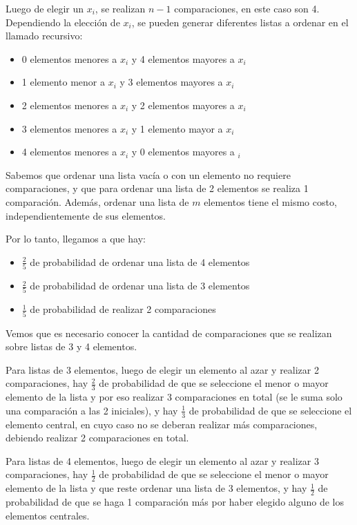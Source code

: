 \documentclass[11pt]{article}
\begin{document}
Luego de elegir un $x_i$, se realizan $n-1$ comparaciones, en este caso son 4. Dependiendo la elección de $x_i$, se pueden generar diferentes listas a ordenar en el llamado recursivo:

\begin{itemize}
    \item 0 elementos menores a $x_i$ y 4 elementos mayores a $x_i$
    \item 1 elemento menor a $x_i$ y 3 elementos mayores a $x_i$
    \item 2 elementos menores a $x_i$ y 2 elementos mayores a $x_i$
    \item 3 elementos menores a $x_i$ y 1 elemento mayor a $x_i$
    \item 4 elementos menores a $x_i$ y 0 elementos mayores a $_i$
\end{itemize}

Sabemos que ordenar una lista vacía o con un elemento no requiere comparaciones, y que para ordenar una lista de 2 elementos se realiza 1 comparación. Además, ordenar una lista de $m$ elementos tiene el mismo costo, independientemente de sus elementos.

Por lo tanto, llegamos a que hay:

\begin{itemize}
    \item $\frac{2}{5}$ de probabilidad de ordenar una lista de 4 elementos
    \item $\frac{2}{5}$ de probabilidad de ordenar una lista de 3 elementos
    \item $\frac{1}{5}$ de probabilidad de realizar 2 comparaciones
\end{itemize}

Vemos que es necesario conocer la cantidad de comparaciones que se realizan sobre listas de 3 y 4 elementos.

Para listas de 3 elementos, luego de elegir un elemento al azar y realizar 2 comparaciones, hay $\frac{2}{3}$ de probabilidad de que se seleccione el menor o mayor elemento de la lista y por eso realizar 3 comparaciones en total (se le suma solo una comparación a las 2 iniciales), y hay $\frac{1}{3}$ de probabilidad de que se seleccione el elemento central, en cuyo caso no se deberan realizar más comparaciones, debiendo realizar 2 comparaciones en total.

Para listas de 4 elementos, luego de elegir un elemento al azar y realizar 3 comparaciones, hay $\frac{1}{2}$ de probabilidad de que se seleccione el menor o mayor elemento de la lista y que reste ordenar una lista de 3 elementos, y hay $\frac{1}{2}$ de probabilidad de que se haga 1 comparación más por haber elegido alguno de los elementos centrales.
\end{document}
